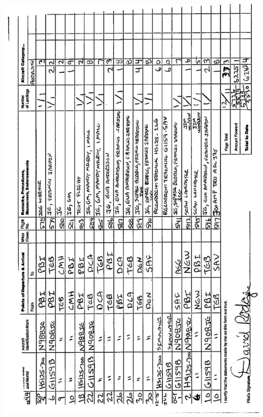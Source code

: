 \documentclass[10pt]{article}
\begin{document}
\includegraphics[max width=\textwidth, center]{2025_02_27_dd68c3d38de88f0516d9g-034}\\
\end{document}
